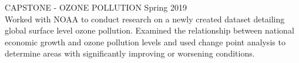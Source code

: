 \documentclass[11pt]{res} %
\begin{document}
\begin{resume}
\begin{hangparas}{.25in}{1}
CAPSTONE - OZONE POLLUTION \hfill Spring 2019	\\
Worked with NOAA to conduct research on a newly created dataset detailing global surface level ozone pollution. Examined the relationship between national economic growth and ozone pollution levels and used change point analysis to determine areas with significantly improving or worsening conditions.
\vspace{-0.15in}  

\end{hangparas}
\end{resume}
\end{document}

